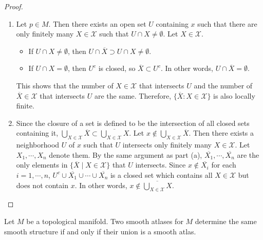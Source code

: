 \begin{proof}
  $ $
  \begin{enumerate}[label=(\alph*)]
    \item
      Let $p \in M$.
      Then there exists an open set $U$ containing $x$ such that there are only finitely many $X \in \mathcal{X}$ such that $U \cap X \ne \emptyset$.
      Let $X \in \mathcal{X}$.
      \begin{itemize}
        \item
          If $U \cap X \ne \emptyset$, then $U \cap \overline{X} \supset U \cap X \ne \emptyset$.
        \item
          If $U \cap X = \emptyset$, then $U^c$ is closed, so $\overline{X} \subset U^c$.
          In other words, $U \cap \overline{X} = \emptyset$.
      \end{itemize}
      This shows that the number of $X \in \mathcal{X}$ that intersects $U$ and the number of $\overline{X} \in \mathcal{X}$ that intersects $U$ are the same.
      Therefore, $\{ \overline{X} : X \in \mathcal{X} \}$ is also locally finite.
    \item
      Since the closure of a set is defined to be the intersection of all closed sets containing it, $\bigcup_{X \in \mathcal{X}} \overline{X} \subset \overline{\bigcup_{X \in \mathcal{X}} X}$.
      Let $x \notin \bigcup_{X \in \mathcal{X}} \overline{X}$.
      Then there exists a neighborhood $U$ of $x$ such that $U$ intersects only finitely many $X \in \mathcal{X}$.
      Let $X_1, \cdots, X_n$ denote them.  By the same argument as part (a), $\overline{X_1}, \cdots, \overline{X_n}$ are the only elements in $\{ \overline{X} \mid X \in \mathcal{X} \}$ that $U$ intersects.
      Since $x \notin \overline{X_i}$ for each $i = 1, \cdots, n$, $U^c \cup \overline{X_1} \cup \cdots \cup \overline{X_n}$ is a closed set which contains all $X \in \mathcal{X}$ but does not contain $x$.
      In other words, $x \notin \overline{\bigcup_{X \in \mathcal{X}} X}$.
  \end{enumerate}
\end{proof}

\begin{customexer}{1.18}
  Let $M$ be a topological manifold.
  Two smooth atlases for $M$ determine the same smooth structure if and only if their union is a smooth atlas.
\end{customexer}

